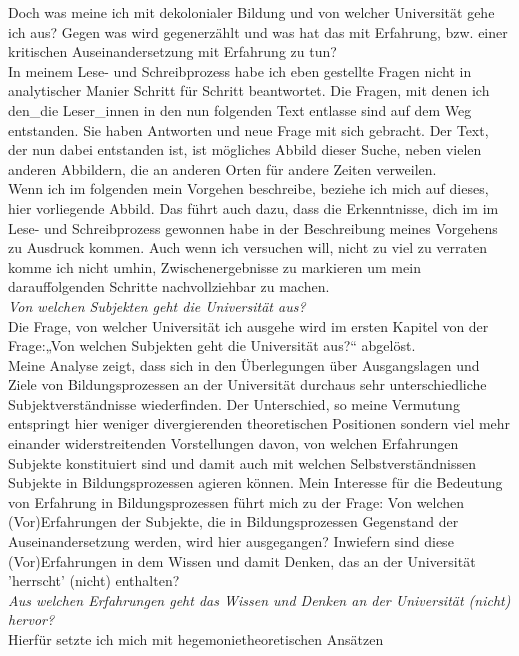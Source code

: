 Doch was meine ich mit dekolonialer Bildung und von welcher Universität gehe
ich aus? Gegen was wird gegenerzählt und was hat das mit Erfahrung, bzw. einer
kritischen Auseinandersetzung mit Erfahrung zu tun?\\

In meinem Lese- und Schreibprozess habe ich eben gestellte Fragen nicht in
analytischer Manier Schritt für Schritt beantwortet. Die Fragen, mit denen ich
den\_die Leser\_innen in den nun folgenden Text entlasse sind auf dem Weg
entstanden. Sie haben Antworten und neue Frage mit sich gebracht. Der Text, der
nun dabei entstanden ist, ist mögliches Abbild dieser Suche, neben vielen
anderen Abbildern, die an anderen Orten für andere Zeiten verweilen.\\
Wenn ich im folgenden mein Vorgehen beschreibe, beziehe ich mich auf dieses,
hier vorliegende  Abbild. Das führt auch dazu, dass die Erkenntnisse, dich im
im Lese- und Schreibprozess gewonnen habe in der Beschreibung meines Vorgehens
zu Ausdruck kommen. Auch wenn ich versuchen will, nicht zu viel zu verraten
komme ich nicht umhin, Zwischenergebnisse zu markieren um mein darauffolgenden
Schritte nachvollziehbar zu machen.\\[0.75em]
\textit{Von welchen Subjekten geht die Universität aus?}\\
Die Frage, von
welcher Universität ich ausgehe wird im ersten Kapitel von der Frage:„Von
welchen Subjekten geht die Universität aus?“ abgelöst.\\
 Meine Analyse zeigt,
dass sich in den Überlegungen über Ausgangslagen und Ziele von
Bildungsprozessen an der Universität durchaus sehr unterschiedliche
Subjektverständnisse wiederfinden. Der Unterschied, so meine Vermutung
entspringt hier weniger divergierenden theoretischen Positionen sondern viel
mehr einander widerstreitenden Vorstellungen davon, von welchen Erfahrungen
Subjekte konstituiert sind und damit auch mit welchen Selbstverständnissen
Subjekte in Bildungsprozessen agieren können. Mein Interesse für die Bedeutung
von Erfahrung in Bildungsprozessen führt mich zu der Frage: Von welchen
(Vor)Erfahrungen der Subjekte, die in Bildungsprozessen Gegenstand der
Auseinandersetzung werden, wird hier ausgegangen? Inwiefern sind diese
(Vor)Erfahrungen in dem Wissen und damit Denken, das an der Universität
'herrscht' (nicht) enthalten?\\[0.75em]
\textit{Aus welchen Erfahrungen geht das Wissen und Denken an der Universität
(nicht) hervor?}\\ 
Hierfür setzte ich mich mit hegemonietheoretischen Ansätzen
